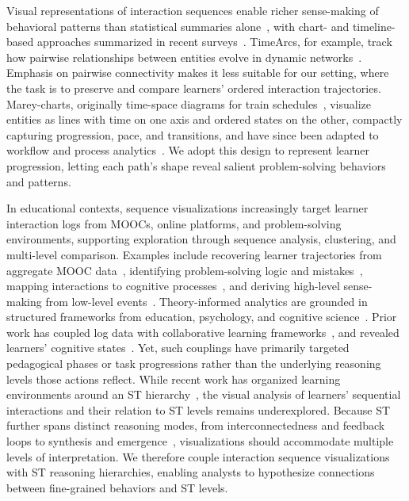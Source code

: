 \documentclass[letterpaper,journal]{IEEEtran}
\begin{document}
Visual representations of interaction sequences enable richer sense-making of behavioral patterns than statistical summaries alone~\cite{chang2009defining, kang2009evaluating}, with chart- and timeline-based approaches summarized in recent surveys~\cite{yeshchenko2024survey, guo2022survey, eltayeby2016survey}.
TimeArcs, for example, track how pairwise relationships between entities evolve in dynamic networks~\cite{dang2016timearcs}. Emphasis on pairwise connectivity makes it less suitable for our setting, where the task is to preserve and compare learners' ordered interaction trajectories.
Marey-charts, originally time-space diagrams for train schedules~\cite{marey1885la, tufte1983visual}, visualize entities as lines with time on one axis and ordered states on the other, compactly capturing progression, pace, and transitions, and have since been adapted to workflow and process analytics~\cite{denisov2018unbiased, elzen2025towards, rubensson2025timeline}.
We adopt this design to represent learner progression, letting each path's shape reveal salient problem-solving behaviors and patterns.

In educational contexts, sequence visualizations increasingly target learner interaction logs from MOOCs, online platforms, and problem-solving environments, supporting exploration through sequence analysis, clustering, and multi-level comparison.
Examples include recovering learner trajectories from aggregate MOOC data~\cite{chen2020viseq}, identifying problem-solving logic and mistakes~\cite{supianto2016visualizations, xia2021qlens, tsung2022blocklens}, mapping interactions to cognitive processes~\cite{reda2014evaluating, yu2025revealing}, and deriving high-level sense-making from low-level events~\cite{gotz2009characterizing}.
Theory-informed analytics are grounded in structured frameworks from education, psychology, and cognitive science~\cite{hillaire2016prototyping}. Prior work has coupled log data with collaborative learning frameworks~\cite{xing2015group}, and revealed learners' cognitive states~\cite{chou2017open, mejia2017novel, pan2022theory}.
Yet, such couplings have primarily targeted pedagogical phases or task progressions rather than the underlying reasoning levels those actions reflect.
While recent work has organized learning environments around an ST hierarchy~\cite{mani2026designing, julsgard2026supporting}, the visual analysis of learners' sequential interactions and their relation to ST levels remains underexplored.
Because ST further spans distinct reasoning modes, from interconnectedness and feedback loops to synthesis and emergence~\cite{cabrera2019what}, visualizations should accommodate multiple levels of interpretation.
We therefore couple interaction sequence visualizations with ST reasoning hierarchies, enabling analysts to hypothesize connections between fine-grained behaviors and ST levels.
\end{document}
